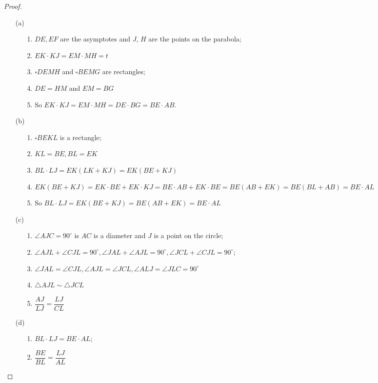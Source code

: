 \documentclass{article}
\begin{document}
\begin{proof}
    ~
    \begin{enumerate}
        \item[(a)] \begin{enumerate}
            \item[1.] $DE,EF$ are the asymptotes and $J$, $H$ are the points on the parabola;
            \item[2.] $EK\cdot KJ=EM\cdot MH=t$
            \item[3.] $\square DEMH$ and $\square BEMG$ are rectangles;
            \item[4.] $DE=HM$ and $EM=BG$
            \item[5.] So $EK\cdot KJ=EM\cdot MH=DE\cdot BG=BE\cdot AB$.
        \end{enumerate}
        \item[(b)] \begin{enumerate}
            \item[1.] $\square BEKL$ is a rectangle;
            \item[2.] $KL=BE,BL=EK$
            \item[3.] $BL\cdot LJ=EK(LK+KJ)=EK(BE+KJ)$
            \item[4.] $EK(BE+KJ)=EK\cdot BE+EK\cdot KJ=BE\cdot AB+EK\cdot BE=BE(AB+EK)=BE(BL+AB)=BE\cdot AL$
            \item[5.] So $BL\cdot LJ=EK(BE+KJ)=BE(AB+EK)=BE\cdot AL$
        \end{enumerate}
        \item[(c)] \begin{enumerate}
            \item[1.] $\angle AJC=90^\circ$ is $AC$ is a diameter and $J$ is a point on the circle;
            \item[2.] $\angle AJL+\angle CJL=90^\circ,\angle JAL+\angle AJL=90^\circ,\angle JCL+\angle CJL=90^\circ$;
            \item[3.] $\angle JAL=\angle CJL,\angle AJL=\angle JCL,\angle ALJ=\angle JLC=90^\circ$
            \item[4.] $\triangle AJL\sim \triangle JCL$
            \item[5.] $\dfrac{AJ}{LJ}=\dfrac{LJ}{CL}$
        \end{enumerate} 
        \item[(d)] \begin{enumerate}
            \item[1.] $BL\cdot LJ=BE\cdot AL$;
            \item[2.] $\dfrac{BE}{BL}=\dfrac{LJ}{AL}$

\end{enumerate}
\end{enumerate}
\end{proof}
\end{document}
